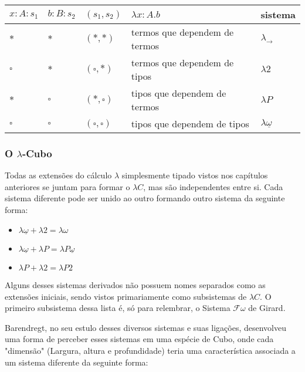 \documentclass[../main.tex]{subfiles}
\begin{document}
\begin{center}
    \begin{tabular}{|l|l|l|l|l|}
    \hline
    $x : A : s_1$ & $b : B : s_2$ & $(s_1, s_2)$         & $\lambda x : A . b$           & sistema                        \\ \hline
    $\ast$        & $\ast$        & $(\ast, \ast)$       & termos que dependem de termos & $\lambda_{\to}$               \\ \hline
    $\square$     & $\ast$        & $(\square, \ast)$    & termos que dependem de tipos  & $\lambda 2$                   \\ \hline
    $\ast$        & $\square$     & $(\ast, \square)$    & tipos que dependem de termos  & $\lambda P$                   \\ \hline
    $\square$     & $\square$     & $(\square, \square)$ & tipos que dependem de tipos   & $\lambda \underline{\omega}$ \\ \hline
    \end{tabular}
\end{center}

\subsubsection{O \texorpdfstring{$\lambda$}{L}-Cubo}

Todas as extensões do cálculo $\lambda$ simplesmente tipado vistos nos capítulos anteriores se juntam para formar o $\lambda C$, mas são independentes entre si. Cada sistema diferente pode ser unido ao outro formando outro sistema da seguinte forma:

\begin{itemize}
    \item $\lambda \underline{\omega} + \lambda 2 = \lambda \omega$
    \item $\lambda \underline{\omega} + \lambda P = \lambda P \underline{\omega}$
    \item $\lambda P + \lambda 2 = \lambda P 2$
\end{itemize}

Alguns desses sistemas derivados não possuem nomes separados como as extensões iniciais, sendo vistos primariamente como subsistemas de $\lambda C$. O primeiro subsistema dessa lista é, só para relembrar, o Sistema $\mathcal{F} \omega$ de Girard.

Barendregt, no seu estulo desses diversos sistemas e suas ligações, desenvolveu uma forma de perceber esses sistemas em uma espécie de Cubo, onde cada "dimensão" (Largura, altura e profundidade) teria uma característica associada a um sistema diferente da seguinte forma:
\end{document}
